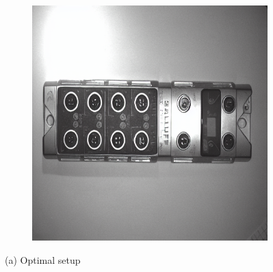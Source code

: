 \documentclass[12pt,DIV14,BCOR12mm,a4paper,footinclude=false,headinclude,parskip=half-,twoside,openright,cleardoublepage=empty,toc=index,bibliography=totoc,listof=totoc]{scrreprt}
\numberwithin{equation}{chapter}
\begin{document}
\begin{figure}
\begin{subfigure}[t]{0.24\textwidth}
        \includegraphics[width=\textwidth]{../media/diff_bni_optimal_fake.png}
    \end{subfigure}
    \caption*{(a) Optimal setup}

    \vspace{0.3cm} %


\end{figure}
\end{document}
